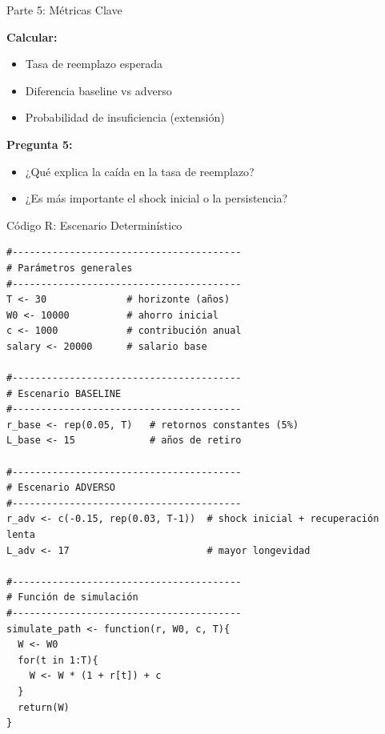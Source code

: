 \documentclass{beamer}
\begin{document}
\begin{frame}{Parte 5: Métricas Clave}

\textbf{Calcular:}

\begin{itemize}
\item Tasa de reemplazo esperada
\item Diferencia baseline vs adverso
\item Probabilidad de insuficiencia (extensión)
\end{itemize}

\vspace{0.4cm}

\textbf{Pregunta 5:}
\begin{itemize}
\item ¿Qué explica la caída en la tasa de reemplazo?
\item ¿Es más importante el shock inicial o la persistencia?
\end{itemize}

\end{frame}
\begin{frame}[fragile]{Código R: Escenario Determinístico}
\tiny
\begin{verbatim}
#----------------------------------------
# Parámetros generales
#----------------------------------------
T <- 30              # horizonte (años)
W0 <- 10000          # ahorro inicial
c <- 1000            # contribución anual
salary <- 20000      # salario base

#----------------------------------------
# Escenario BASELINE
#----------------------------------------
r_base <- rep(0.05, T)   # retornos constantes (5%)
L_base <- 15             # años de retiro

#----------------------------------------
# Escenario ADVERSO
#----------------------------------------
r_adv <- c(-0.15, rep(0.03, T-1))  # shock inicial + recuperación lenta
L_adv <- 17                        # mayor longevidad

#----------------------------------------
# Función de simulación
#----------------------------------------
simulate_path <- function(r, W0, c, T){
  W <- W0
  for(t in 1:T){
    W <- W * (1 + r[t]) + c
  }
  return(W)
}
\end{verbatim}
   
\end{frame}
\end{document}
